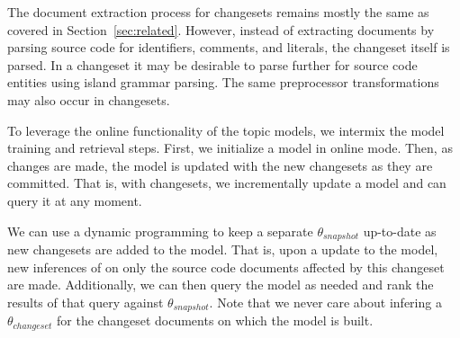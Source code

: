 The document extraction process for changesets remains mostly the same as covered in Section~\ref{sec:related}.
However, instead of extracting documents by parsing source code for identifiers, comments, and literals,
the changeset itself is parsed.
In a changeset it may be desirable to parse further for source code entities using island grammar parsing\needcite.
The same preprocessor transformations may also occur in changesets.

To leverage the online functionality of the topic models,
we intermix the model training and retrieval steps.
First, we initialize a model in online mode.
Then, as changes are made, the model is updated with the new changesets as they are committed.
That is, with changesets, we incrementally update a model and can query it at any moment.

We can use a dynamic programming to keep a separate $\theta_{snapshot}$
up-to-date as new changesets are added to the model.
That is, upon a update to the model, new inferences of on only the source code documents affected by this changeset are made.
Additionally, we can then query the model as needed 
and rank the results of that query against $\theta_{snapshot}$.
Note that we never care about infering a $\theta_{changeset}$ 
for the changeset documents on which the model is built.

